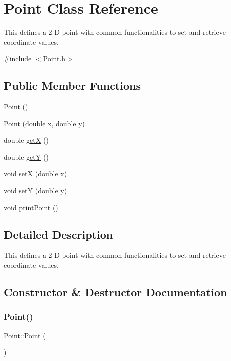 \hypertarget{classPoint}{}\section{Point Class Reference}
\label{classPoint}


This defines a 2-\/D point with common functionalities to set and retrieve coordinate values.  




{\ttfamily \#include $<$Point.\+h$>$}

\subsection*{Public Member Functions}
\begin{DoxyCompactItemize}
\item 
\hyperlink{classPoint_ad92f2337b839a94ce97dcdb439b4325a}{Point} ()
\item 
\hyperlink{classPoint_a78b55e8d5466bb8c2cf60fa55f2562ff}{Point} (double x, double y)
\item 
double \hyperlink{classPoint_a8de35a6098cdd7267b4167776da83da6}{getX} ()
\item 
double \hyperlink{classPoint_aa278c8bcb8aeb4101023a4baf473b547}{getY} ()
\item 
void \hyperlink{classPoint_a9aa66c310860d038cb1258dc5cd80906}{setX} (double x)
\item 
void \hyperlink{classPoint_a7d1ee63237f361d41e697f87c3cb051d}{setY} (double y)
\item 
void \hyperlink{classPoint_ad32f6a515be1cf069bf5ea6b89178ae9}{print\+Point} ()
\end{DoxyCompactItemize}


\subsection{Detailed Description}
This defines a 2-\/D point with common functionalities to set and retrieve coordinate values. 

\subsection{Constructor \& Destructor Documentation}
\mbox{\label{classPoint_ad92f2337b839a94ce97dcdb439b4325a}} 
\subsubsection{\texorpdfstring{Point()}{Point()}\hspace{0.1cm}{\footnotesize\ttfamily [1/2]}}
{\footnotesize\ttfamily Point\+::\+Point (\begin{DoxyParamCaption}{ }\end{DoxyParamCaption})}

